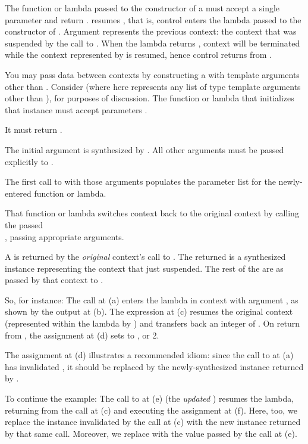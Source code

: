 The function or lambda passed to the constructor of
a \ectxvoid must accept a single \ectxvoid parameter and return \ectxvoid.
 resumes , that is, control enters the lambda passed to
the constructor of . Argument  represents the previous
context: the context that was suspended by the call to . When the
lambda returns , context  will be terminated while the
context represented by  is resumed, hence control returns
from .


\label{subsec:ectxdata}
You may pass data between contexts by constructing a \ectx with template
arguments other than . Consider \ectxargs (where  here
represents any list of type template arguments other than ), for
purposes of discussion. The function or lambda that initializes that instance
must accept parameters \ectxargsargsargs.

It must return .

The initial \ectx argument is synthesized by \op. All other arguments must be
passed explicitly to \op.

The first call to \op with those arguments populates the parameter list for
the newly-entered function or lambda.

That function or lambda switches context back to the original context by
calling the passed\\
\ectxop, passing appropriate arguments.

A \ectxargstup is returned by the \emph{original} context's call to \op. The
returned \ectx is a synthesized instance representing the context that just
suspended. The rest of the  are as passed by that context to \op.

So, for instance:
The  call at (a) enters the lambda in context  with
argument , as shown by the output at (b). The
expression  at (c) resumes the original context (represented
within the lambda by ) and transfers back an integer of .
On return from , the assignment at (d) sets  to ,
or 2.

The assignment at (d) illustrates a recommended idiom: since the call to \op
at (a) has invalidated , it should be replaced by the
newly-synthesized \ectx instance returned by \op.

To continue the example:
The call to  at (e) (the \emph{updated} ) resumes
the  lambda, returning from the  call at (c) and
executing the assignment at (f). Here, too, we replace the \ectx
instance  invalidated by the \op call at (c) with the new instance
returned by that same \op call. Moreover, we replace  with the value
passed by the call at (e).

